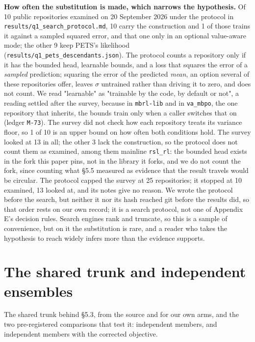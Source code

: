 \documentclass[10pt]{article}
\begin{document}
\textbf{How often the substitution is made, which narrows the hypothesis.} Of 10 public repositories examined on 20 September 2026 under the protocol in \texttt{results/\allowbreak{}q1\_\allowbreak{}search\_\allowbreak{}protocol\allowbreak{}.md}, 10 carry the construction and 1 of those trains it against a sampled squared error, and that one only in an optional value-aware mode; the other 9 keep PETS's likelihood (\texttt{results/\allowbreak{}q1\_\allowbreak{}pets\_\allowbreak{}descendants\allowbreak{}.json}). The protocol counts a repository only if it has the bounded head, learnable bounds, and a loss that squares the error of a \emph{sampled} prediction; squaring the error of the predicted \emph{mean}, an option several of these repositories offer, leaves $\sigma$ untrained rather than driving it to zero, and does not count. We read "learnable" as "trainable by the code, by default or not", a reading settled after the survey, because in \texttt{mbrl-lib} and in \texttt{va\_mbpo}, the one repository that inherits, the bounds train only when a caller switches that on (ledger \texttt{M-73}). The survey did not check how each repository treats its variance floor, so 1 of 10 is an upper bound on how often both conditions hold. The survey looked at 13 in all; the other 3 lack the construction, so the protocol does not count them as examined, among them mainline \texttt{rsl\_rl}: the bounded head exists in the fork this paper pins, not in the library it forks, and we do not count the fork, since counting what \S{}5.5 measured as evidence that the result travels would be circular. The protocol capped the survey at 25 repositories; it stopped at 10 examined, 13 looked at, and its notes give no reason. We wrote the protocol before the search, but neither it nor its hash reached git before the results did, so that order rests on our own record; it is a search protocol, not one of Appendix E's decision rules. Search engines rank and truncate, so this is a sample of convenience, but on it the substitution is rare, and a reader who takes the hypothesis to reach widely infers more than the evidence supports.


\section{The shared trunk and independent ensembles}

The shared trunk behind \S{}5.3, from the source and for our own arms, and the two pre-registered comparisons that test it: independent members, and independent members with the corrected objective.
\end{document}
